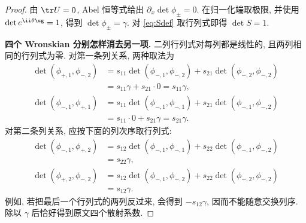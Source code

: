 \begin{proof}
由 $\tr U=0$, Abel 恒等式给出 $\partial_x\det\phi_\pm=0$. 在归一化端取极限, 并使用 $\det e^{\ii\theta\sg}=1$, 得到 $\det\phi_\pm=\gamma$. 对 \eqref{eq:Sdef} 取行列式即得 $\det S=1$. 
\par\medskip\noindent\textbf{四个 Wronskian 分别怎样消去另一项.}\quad 
二列行列式对每列都是线性的, 且两列相同的行列式为零.
对第一条列关系, 两种取法为
\begin{align*}
\det(\phi_{+,1},\phi_{-,2})
&=s_{11}\det(\phi_{-,1},\phi_{-,2})
+s_{21}\det(\phi_{-,2},\phi_{-,2})\\
&=s_{11}\gamma+s_{21}\cdot0=s_{11}\gamma,\\
\det(\phi_{-,1},\phi_{+,1})
&=s_{11}\det(\phi_{-,1},\phi_{-,1})
+s_{21}\det(\phi_{-,1},\phi_{-,2})\\
&=s_{11}\cdot0+s_{21}\gamma=s_{21}\gamma.
\end{align*}
对第二条列关系, 应按下面的列次序取行列式:
\begin{align*}
\det(\phi_{-,1},\phi_{+,2})
&=s_{12}\det(\phi_{-,1},\phi_{-,1})
+s_{22}\det(\phi_{-,1},\phi_{-,2})\\
&=s_{22}\gamma,\\
\det(\phi_{+,2},\phi_{-,2})
&=s_{12}\det(\phi_{-,1},\phi_{-,2})
+s_{22}\det(\phi_{-,2},\phi_{-,2})\\
&=s_{12}\gamma.
\end{align*}
例如, 若把最后一个行列式的两列反过来,
会得到 $-s_{12}\gamma$, 因而不能随意交换列序.
除以 $\gamma$ 后恰好得到原文四个散射系数.


\end{proof}
